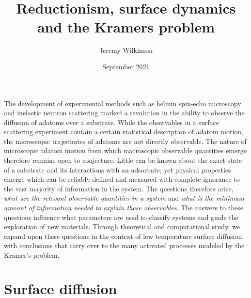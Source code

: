 \documentclass[7pt]{article}
\title{Reductionism, surface dynamics and the Kramers problem}
\author{Jeremy Wilkinson}
\date{September 2021}
\begin{document}
\maketitle

The development of experimental methods such as helium spin-echo microscopy\cite{FouquetHSEM, JardineHSEM} and inelastic neutron scattering\cite{Wright1983} marked a revolution in the ability to observe the diffusion of adatoms over a substrate. While the observables in a surface scattering experiment contain a certain statistical description of adatom motion\cite{vanHowe}, the microscopic trajectories of adatoms are not directly observable. The nature of microscopic adatom motion from which macroscopic observable quantities emerge therefore remains open to conjecture. Little can be known about the exact state of a substrate and its interactions with an adsorbate, yet physical properties emerge which can be reliably defined and measured with complete ignorance to the vast majority of information in the system. The questions therefore arise, \emph{what are the relevant observable quantities in a system} and \emph{what is the minimum amount of information needed to explain these observables}. The answers to these questions influence what parameters are used to classify systems and guide the exploration of new materials. Through theoretical and computational study, we expand upon these questions in the context of low temperature surface diffusion, with conclusions that carry over to the many activated processes modeled by the Kramer's problem. 


\section*{Surface diffusion}
\end{document}
